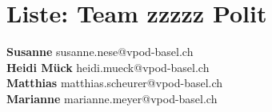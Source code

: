 \documentclass{scrartcl}
\begin{document}
\section*{Liste: Team zzzzz Polit}
\textbf{Susanne } susanne.nese@vpod-basel.ch\\
\textbf{Heidi Mück      } heidi.mueck@vpod-basel.ch\\
\textbf{Matthias } matthias.scheurer@vpod-basel.ch\\
\textbf{Marianne } marianne.meyer@vpod-basel.ch\\
\end{document}
